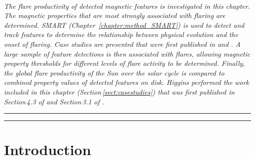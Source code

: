 \\ {\it 
The flare productivity of detected magnetic features is investigated in this chapter. The magnetic properties that are most strongly associated with flaring are determined. SMART (Chapter~\ref{chapter:method_SMART}) is used to detect and track features to determine the relationship between physical evolution and the onset of flaring. Case studies are presented that were first published in \emph{} and \emph{}. A large sample of feature detections is then associated with flares, allowing magnetic property thresholds for different levels of flare activity to be determined. Finally, the global flare productivity of the Sun over the solar cycle is compared to combined property values of detected features on disk. Higgins performed the work included in this chapter (Section\,\ref{sect:casestudies}) that was first published in  Section\,4.3 of \emph{ and Section\,3.1 of \emph{}.
} \\ 
\hrule height 0.4mm
\vspace{0.5mm}
\hrule height 1mm 
\vspace{1.5cm}


\section{Introduction}

}
